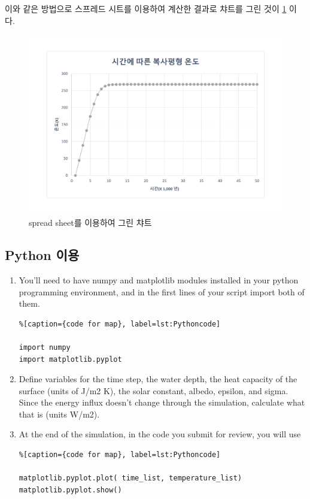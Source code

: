 {이와 같은 방법으로 스프레드 시트를 이용하여 계산한 결과로 챠트를 그린 것이 \ref{fig:nakedchart01} 이다. 
\begin{figure}[b!]
	\centering
	\includegraphics[width=0.8\linewidth]{Pictures/naked__chart01}
	\caption{spread sheet를 이용하여 그린 챠트}
	\label{fig:nakedchart01}
\end{figure}

\newpage

\subsection{Python 이용}\index{}
\begin{enumerate}
	\item You’ll need to have numpy and matplotlib modules installed in your python programming environment, and in the first lines of your script import both of them.


\begin{lstlisting}%[caption={code for map}, label=lst:Pythoncode]

import numpy
import matplotlib.pyplot
\end{lstlisting}

	\item Define variables for the time step, the water depth, the heat capacity of the surface (units of J/m2 K), the solar constant, albedo, epsilon, and sigma. Since the energy influx doesn’t change through the simulation, calculate what that is (units W/m2).
	\item At the end of the simulation, in the code you submit for review, you will use

\begin{lstlisting}%[caption={code for map}, label=lst:Pythoncode]

matplotlib.pyplot.plot( time_list, temperature_list)
matplotlib.pyplot.show()
\end{lstlisting}


\end{enumerate}}
